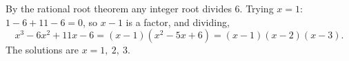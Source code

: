 By the rational root theorem any integer root divides $6$. Trying $x=1$: $1-6+11-6=0$, so $x-1$ is a factor, and dividing,
\[
x^3-6x^2+11x-6=(x-1)(x^2-5x+6)=(x-1)(x-2)(x-3).
\]
The solutions are $\boxed{x=1,\ 2,\ 3}$.
